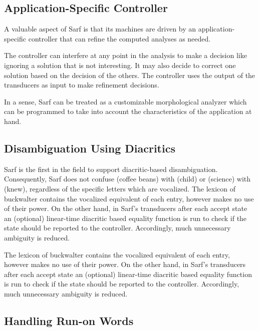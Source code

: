 \documentclass[a4,12pt]{report}
\begin{document}
\subsection{Application-Specific Controller}

A valuable aspect of Sarf is that its machines are driven by 
an application-specific controller that can refine the computed
analyses as needed.

The controller can interfere at any point in the 
analysis to make a decision like ignoring a solution that 
is not interesting. 
It may also decide to correct one solution
based on the decision of the others. 
The controller uses the output of the transducers as input
to make 
refinement decisions.

In a sense, Sarf can be treated as a customizable morphological analyzer which can be
programmed to take into account the characteristics of the application at hand.

\subsection{Disambiguation Using Diacritics}
\label{sec:diacritics}

Sarf is the first in the field to support diacritic-based disambiguation. Consequently, 
Sarf does not confuse  (coffee beans) with  (child)
or  (science) with  (knew), regardless of the specific letters which are vocalized.
The lexicon of buckwalter contains the vocalized equivalent of each entry, however makes no use of their power. 
On the other hand, in Sarf's transducers after each accept state an (optional) linear-time diacritic based equality function is run
to check if the state should be reported to the controller. Accordingly, much unnecessary ambiguity is reduced.

The lexicon of buckwalter contains the vocalized equivalent of each entry, however makes no use of their power. 
On the other hand, in Sarf's transducers after each accept state an (optional) linear-time diacritic based equality function is run
to check if the state should be reported to the controller. Accordingly, much unnecessary ambiguity is reduced.

\subsection{Handling Run-on Words}
\label{sec:runon}
\end{document}

